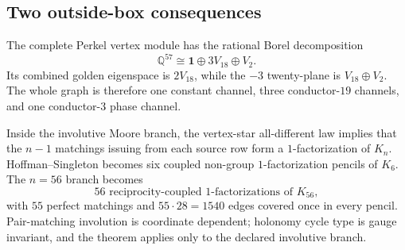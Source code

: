 \subsection{Two outside-box consequences}

The complete Perkel vertex module has the rational Borel decomposition
\[
\boxed{\mathbb Q^{57}\cong\mathbf1\oplus3V_{18}\oplus V_2.}
\]
Its combined golden eigenspace is $2V_{18}$, while the $-3$ twenty-plane is $V_{18}\oplus V_2$.  The whole graph is therefore one constant channel, three conductor-$19$ channels, and one conductor-$3$ phase channel.

Inside the involutive Moore branch, the vertex-star all-different law implies that the $n-1$ matchings issuing from each source row form a $1$-factorization of $K_n$.  Hoffman--Singleton becomes six coupled non-group $1$-factorization pencils of $K_6$.  The $n=56$ branch becomes
\[
\boxed{56\text{ reciprocity-coupled }1\text{-factorizations of }K_{56},}
\]
with $55$ perfect matchings and $55\cdot28=1540$ edges covered once in every pencil.  Pair-matching involution is coordinate dependent; holonomy cycle type is gauge invariant, and the theorem applies only to the declared involutive branch.
